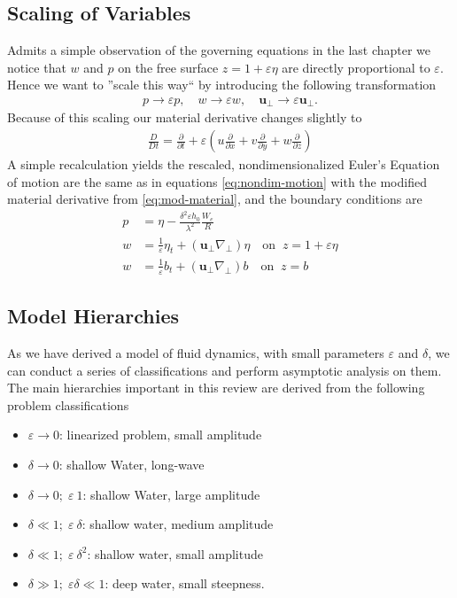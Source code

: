 \subsection{Scaling of Variables}
Admits a simple observation of the governing equations in the last chapter we
notice that $w$ and $p$ on the free surface $z = 1 + \varepsilon\eta$ are
directly proportional to $\varepsilon$. Hence we want to ''scale this way``
by introducing the following transformation
\begin{align}
    p \rightarrow \varepsilon p, \quad w \rightarrow \varepsilon w, \quad
    \mathbf{u}_\perp \rightarrow \varepsilon \mathbf{u}_\perp.
\end{align}
Because of this scaling our material derivative changes slightly to
\begin{align}\label{eq:mod-material}
    \frac{D}{Dt} = \frac{\partial }{\partial t} + \varepsilon\left(u
    \frac{\partial }{\partial x}  + v \frac{\partial }{\partial y}  + w
    \frac{\partial }{\partial z} \right)
\end{align}
A simple recalculation yields the rescaled, nondimensionalized Euler's
Equation of motion are the same as in equations \ref{eq:nondim-motion} with
the modified material derivative from \ref{eq:mod-material}, and the boundary
conditions are
\begin{align}
    p &= \eta - \frac{\delta^2\varepsilon h_0}{\lambda^2} \frac{W_e}{R}\\
    w &= \frac{1}{\varepsilon}\eta_t + (\mathbf{u}_\perp \nabla_\perp)\eta
    \quad \text{on}\;\; z = 1+\varepsilon\eta\\
    w &=\frac{1}{\varepsilon}b_t + (\mathbf{u}_\perp \nabla_\perp)b \quad
    \text{on}\;\; z=b
\end{align}
\subsection{Model Hierarchies}
As we have derived a model of fluid dynamics, with small parameters
$\varepsilon$ and $\delta$, we can conduct a series of classifications and
perform asymptotic analysis on them. The main hierarchies important in this
review are derived from the following problem classifications
\begin{itemize}
    \item $\varepsilon\rightarrow 0$: linearized problem, small amplitude
    \item $\delta\rightarrow 0$: shallow Water, long-wave
    \item$\delta \rightarrow 0;\; \varepsilon~1$: shallow Water, large
        amplitude
    \item $\delta\ll 1;\; \varepsilon~\delta$: shallow water, medium
        amplitude
    \item $\delta\ll 1;\; \varepsilon~\delta^2$: shallow water, small
        amplitude
    \item $\delta \gg 1;\; \varepsilon\delta\ll 1$: deep water, small
        steepness.
\end{itemize}



